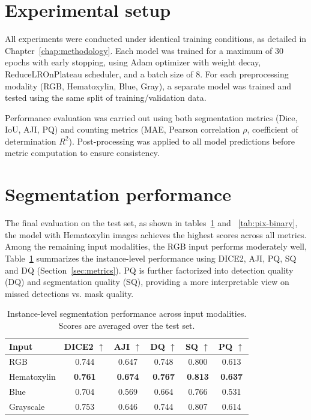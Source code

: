 \documentclass[target=bach,aauheader=,style=]{thud}
\begin{document}
\section{Experimental setup}
All experiments were conducted under identical training conditions, as detailed in Chapter~\ref{chap:methodology}. 
Each model was trained for a maximum of 30 epochs with early stopping, using Adam optimizer with weight decay, ReduceLROnPlateau scheduler, and a batch size of 8. 
For each preprocessing modality (RGB, Hematoxylin, Blue, Gray), a separate model was trained and tested using the same split of training/validation data.

Performance evaluation was carried out using both segmentation metrics (Dice, IoU, AJI, PQ) and counting metrics (MAE, Pearson correlation $\rho$, coefficient of determination $R^2$). 
Post-processing was applied to all model predictions before metric computation to ensure consistency.

\section{Segmentation performance}

The final evaluation on the test set, as shown in tables~\ref{tab:iou-results} and ~\ref{tab:pix-binary}, the model with Hematoxylin images achieves the highest scores across all metrics.\\
Among the remaining input modalities, the RGB input performs moderately well,  
Table~\ref{tab:iou-results}  summarizes the instance-level performance using DICE2, AJI, PQ, SQ and DQ (Section~\ref{sec:metrics}). 
PQ is further factorized into detection quality (DQ) and segmentation quality (SQ), providing a more interpretable view on missed detections vs. mask quality.

\begin{table}[ht]
\centering
\caption{Instance-level segmentation performance across input modalities. Scores are averaged over the test set.}
\label{tab:iou-results}
\small
\begin{tabular}{lccccc}
\toprule
\textbf{Input} & \textbf{DICE2} $\uparrow$ & \textbf{AJI} $\uparrow$ & \textbf{DQ} $\uparrow$ & \textbf{SQ} $\uparrow$ & \textbf{PQ} $\uparrow$\\
\midrule
RGB         & 0.744 & 0.647 & 0.748 & 0.800 & 0.613\\
Hematoxylin & \textbf{0.761} & \textbf{0.674} & \textbf{0.767} & \textbf{0.813} & \textbf{0.637}\\
Blue        & 0.704 & 0.569 & 0.664 & 0.766 & 0.531\\
Grayscale   & 0.753 & 0.646 & 0.744 & 0.807 & 0.614\\
\bottomrule
\end{tabular}
\end{table}
\end{document}
